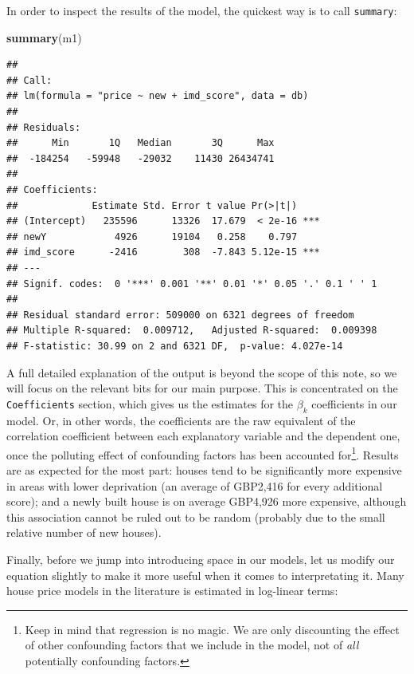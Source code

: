\documentclass[]{book}
\newenvironment{Shaded}{\begin{snugshade}}{\end{snugshade}}
\newcommand{\KeywordTok}[1]{\textcolor[rgb]{0.13,0.29,0.53}{\textbf{#1}}}
\newcommand{\NormalTok}[1]{#1}
\begin{document}
In order to inspect the results of the model, the quickest way is to
call \texttt{summary}:

\begin{Shaded}
\begin{Highlighting}[]
\KeywordTok{summary}\NormalTok{(m1)}
\end{Highlighting}
\end{Shaded}

\begin{verbatim}
## 
## Call:
## lm(formula = "price ~ new + imd_score", data = db)
## 
## Residuals:
##      Min       1Q   Median       3Q      Max 
##  -184254   -59948   -29032    11430 26434741 
## 
## Coefficients:
##             Estimate Std. Error t value Pr(>|t|)    
## (Intercept)   235596      13326  17.679  < 2e-16 ***
## newY            4926      19104   0.258    0.797    
## imd_score      -2416        308  -7.843 5.12e-15 ***
## ---
## Signif. codes:  0 '***' 0.001 '**' 0.01 '*' 0.05 '.' 0.1 ' ' 1
## 
## Residual standard error: 509000 on 6321 degrees of freedom
## Multiple R-squared:  0.009712,   Adjusted R-squared:  0.009398 
## F-statistic: 30.99 on 2 and 6321 DF,  p-value: 4.027e-14
\end{verbatim}

A full detailed explanation of the output is beyond the scope of this
note, so we will focus on the relevant bits for our main purpose. This
is concentrated on the \texttt{Coefficients} section, which gives us the
estimates for the \(\beta_k\) coefficients in our model. Or, in other
words, the coefficients are the raw equivalent of the correlation
coefficient between each explanatory variable and the dependent one,
once the polluting effect of confounding factors has been accounted
for\footnote{Keep in mind that regression is no magic. We are only
  discounting the effect of other confounding factors that we include in
  the model, not of \emph{all} potentially confounding factors.}.
Results are as expected for the most part: houses tend to be
significantly more expensive in areas with lower deprivation (an average
of GBP2,416 for every additional score); and a newly built house is on
average GBP4,926 more expensive, although this association cannot be
ruled out to be random (probably due to the small relative number of new
houses).

Finally, before we jump into introducing space in our models, let us
modify our equation slightly to make it more useful when it comes to
interpretating it. Many house price models in the literature is
estimated in log-linear terms:
\end{document}
